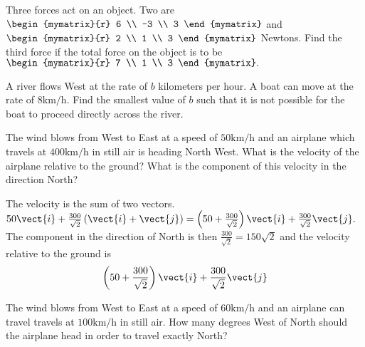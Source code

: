 \begin{enumialphparenastyle}
\begin{ex} Three forces act on an object. Two are $\begin{mymatrix}{r}
6 \\
-3 \\
3
\end{mymatrix} $ and $\begin{mymatrix}{r}
2 \\
1 \\
3
\end{mymatrix} $ Newtons. Find the third force if the total force on the object is
to be $\begin{mymatrix}{r}
7 \\
1 \\
3
\end{mymatrix} .$ \vspace{1mm}
\end{ex}

\begin{ex} A river flows West at the rate of $b$ kilometers per hour. A boat can move
at the rate of $8\textrm{km}/\textrm{h}$. Find the smallest value of $b$ such that
it is not possible for the boat to proceed directly across the river.
\vspace{1mm}
\end{ex}

\begin{ex} The wind blows from West to East at a speed of $50\textrm{km}/\textrm{h}$ and
an airplane which travels at $400\textrm{km}/\textrm{h}$ in still air is heading
North West. What is the velocity of the airplane relative to the ground?
What is the component of this velocity in the direction North? \vspace{1mm}
\begin{sol}
The velocity is the sum of two vectors. $50\vect{i}+\frac{
300}{\sqrt{2}} \left( \vect{i}+\vect{j}\right) =\left( 50+\frac{300}{\sqrt{2}}
\right) \vect{i}+ \frac{300}{\sqrt{2}}\vect{j}.$ The component in the
direction of North is then $\frac{300}{\sqrt{2}}= 150\sqrt{2}$
and the velocity relative to the ground is
\[
\left( 50+\frac{300}{\sqrt{2}}\right) \vect{i}+\frac{300}{\sqrt{2}}\vect{j}
\]
\end{sol}
\end{ex}

\begin{ex} The wind blows from West to East at a speed of $60\textrm{km}/\textrm{h}$ and
an airplane can travel travels at $100\textrm{km}/\textrm{h}$ in still air. How
many degrees West of North should the airplane head in order to travel
exactly North? \vspace{1mm}
\end{ex}



\end{enumialphparenastyle}
